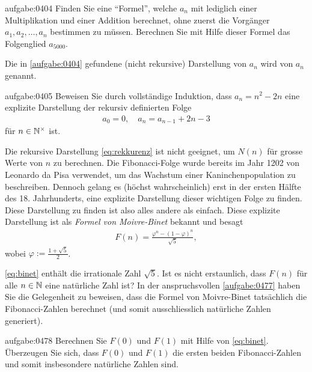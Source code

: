 \begin{aufgabe}{aufgabe:0404}
Finden Sie eine \enquote{Formel}, welche $a_n$ mit lediglich einer Multiplikation und einer Addition berechnet, ohne zuerst die Vorgänger $a_{1}, a_{2}, \ldots, a_{n}$ bestimmen zu müssen. Berechnen Sie mit Hilfe dieser Formel das Folgenglied $a_{5000}$.
\end{aufgabe}
\noindent
Die in \cref{aufgabe:0404} gefundene (nicht rekursive) Darstellung von $a_n$ wird  von $a_n$ genannt.

\begin{aufgabe}{aufgabe:0405}
Beweisen Sie durch vollständige Induktion, dass $a_n = n^2 -2n$ eine explizite Darstellung der rekursiv definierten Folge
\begin{align*}
    a_0 = 0, \quad a_{n} = a_{n-1} + 2n - 3
\end{align*}
für $n\in\mathbb{N}^{\times}$ ist.
\end{aufgabe}
\noindent
Die rekursive Darstellung \cref{eq:rekkurenz} ist nicht geeignet, um $N(n)$ für grosse Werte von $n$ zu berechnen. Die Fibonacci-Folge wurde bereits im  Jahr 1202 von Leonardo da Pisa verwendet, um das Wachstum einer Kaninchenpopulation zu beschreiben. Dennoch gelang es (höchst wahrscheinlich) erst in der ersten Hälfte des 18. Jahrhunderts, eine explizite Darstellung dieser wichtigen Folge zu finden. Diese Darstellung zu finden ist also alles andere als einfach. Diese explizite Darstellung ist als \textit{Formel von Moivre-Binet} bekannt und besagt
\begin{align}\label{eq:binet}
    F(n) = \frac{\varphi^n - (1-\varphi)^n}{\sqrt{5}},
\end{align}
wobei $\varphi := \frac{1+\sqrt{5}}{2}$.

\cref{eq:binet} enthält die irrationale Zahl $\sqrt{5}$. Ist es nicht erstaunlich, dass $F(n)$ für alle $n\in\mathbb{N}$ eine natürliche Zahl ist? In der anspruchsvollen \cref{aufgabe:0477} haben Sie die Gelegenheit zu beweisen, dass die Formel von Moivre-Binet tatsächlich die Fibonacci-Zahlen berechnet (und somit ausschliesslich natürliche Zahlen generiert).

\begin{aufgabe}{aufgabe:0478}
Berechnen Sie $F(0)$ und $F(1)$ mit Hilfe von \cref{eq:binet}. Überzeugen Sie sich, dass $F(0)$ und $F(1)$ die ersten beiden Fibonacci-Zahlen und somit insbesondere natürliche Zahlen sind.
\end{aufgabe}

